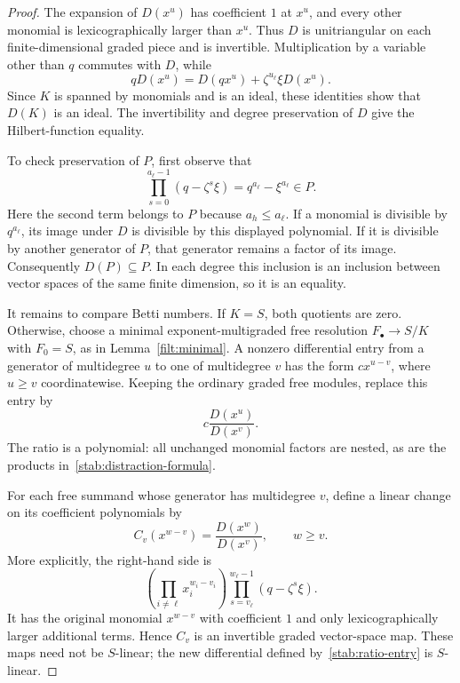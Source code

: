 \begin{proof}
The expansion of $D(x^u)$ has coefficient $1$ at $x^u$, and every
other monomial is lexicographically larger than $x^u$.  Thus $D$ is
unitriangular on each finite-dimensional graded piece and is invertible.
Multiplication by a variable other than $q$ commutes with $D$, while
\begin{equation}
\label{stab:multiplication}
 qD(x^u)=D(qx^u)+\zeta^{u_\ell}\xi D(x^u).
\end{equation}
Since $K$ is spanned by monomials and is an ideal, these identities show
that $D(K)$ is an ideal.  The invertibility and degree preservation of
$D$ give the Hilbert-function equality.

To check preservation of $P$, first observe that
\[
 \prod_{s=0}^{a_\ell-1}(q-\zeta^s\xi)
       =q^{a_\ell}-\xi^{a_\ell}\in P.
\]
Here the second term belongs to $P$ because $a_h\le a_\ell$.
If a monomial is divisible by $q^{a_\ell}$, its image under $D$ is
divisible by this displayed polynomial.  If it is divisible by another
generator of $P$, that generator remains a factor of its image.
Consequently $D(P)\subseteq P$.  In each degree this inclusion is an
inclusion between vector spaces of the same finite dimension, so it is
an equality.

It remains to compare Betti numbers.  If $K=S$, both quotients are zero.
Otherwise, choose a minimal exponent-multigraded free resolution
$F_\bullet\to S/K$ with $F_0=S$, as in
Lemma~\ref{filt:minimal}.  A nonzero differential entry from a generator
of multidegree $u$ to one of multidegree $v$ has the form
$c x^{u-v}$, where $u\ge v$ coordinatewise.  Keeping the ordinary
graded free modules, replace this entry by
\begin{equation}
\label{stab:ratio-entry}
 c\frac{D(x^u)}{D(x^v)}.
\end{equation}
The ratio is a polynomial: all unchanged monomial factors are nested,
as are the products in~\eqref{stab:distraction-formula}.

For each free summand whose generator has multidegree $v$, define a
linear change on its coefficient polynomials by
\begin{equation}
\label{stab:coefficient-change}
 C_v(x^{w-v})=\frac{D(x^w)}{D(x^v)},\qquad w\ge v.
\end{equation}
More explicitly, the right-hand side is
\[
 \left(\prod_{i\ne\ell}x_i^{w_i-v_i}\right)
       \prod_{s=v_\ell}^{w_\ell-1}(q-\zeta^s\xi).
\]
It has the original monomial $x^{w-v}$ with coefficient $1$ and only
lexicographically larger additional terms.  Hence $C_v$ is an
invertible graded vector-space map.  These maps need not be
$S$-linear; the new differential defined by~\eqref{stab:ratio-entry}
is $S$-linear.


\end{proof}
